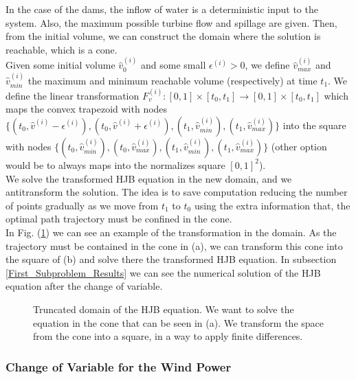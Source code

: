 In the case of the dams, the inflow of water is a deterministic input to the system. Also, the maximum possible turbine flow and spillage are given. Then, from the initial volume, we can construct the domain where the solution is reachable, which is a cone.\\
Given some initial volume $\hat{v}_0^{(i)}$ and some small $\epsilon^{(i)}>0$, we define $\hat{v}^{(i)}_{max}$ and $\hat{v}^{(i)}_{min}$ the maximum and minimum reachable volume (respectively) at time $t_1$. We define the linear transformation $F_v^{(i)}:[0,1]\times[t_0,t_1]\to[0,1]\times[t_0,t_1]$ which maps the convex trapezoid with nodes $\{(t_0,\hat{v}^{(i)}-\epsilon^{(i)}),(t_0,\hat{v}^{(i)}+\epsilon^{(i)}),(t_1,\hat{v}^{(i)}_{min}),(t_1,\hat{v}^{(i)}_{max})\}$ into the square with nodes $\{(t_0,\hat{v}^{(i)}_{min}),(t_0,\hat{v}^{(i)}_{max}),(t_1,\hat{v}^{(i)}_{min}),(t_1,\hat{v}^{(i)}_{max})\}$ (other option would be to always maps into the normalizes square $[0,1]^2$).\\
We solve the transformed HJB equation in the new domain, and we antitransform the solution. The idea is to save computation reducing the number of points gradually as we move from $t_1$ to $t_0$ using the extra information that, the optimal path trajectory must be confined in the cone.\\
In Fig. (\ref{Cone}) we can see an example of the transformation in the domain. As the trajectory must be contained in the cone in (a), we can transform this cone into the square of (b) and solve there the transformed HJB equation. In subsection \ref{First_Subproblem_Results} we can see the numerical solution of the HJB equation after the change of variable.
\begin{figure}[!ht]
\centering
{}\qquad
{}
\caption{Truncated domain of the HJB equation. We want to solve the equation in the cone that can be seen in (a). We transform the space from the cone into a square, in a way to apply finite differences.}
\label{Cone}
\end{figure}

\subsubsection{Change of Variable for the Wind Power} \label{Subsection_Transformation_Wind}

